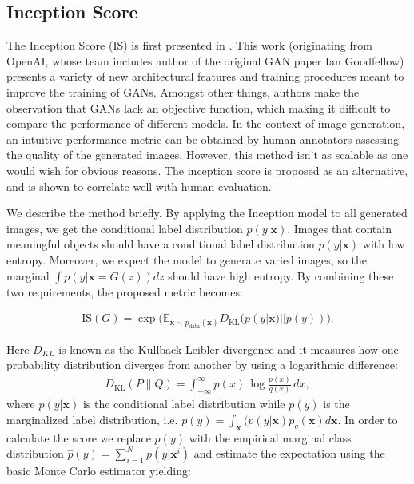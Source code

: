 \subsection{Inception Score}
The Inception Score (IS) is first presented in \cite{salimans2016improved}. This work (originating from OpenAI, whose team includes author of the original GAN paper Ian Goodfellow) presents a variety of new architectural features and training procedures meant to improve the training of GANs. Amongst other things, authors make the observation that GANs lack an objective function, which making it difficult to compare the performance of different models. In the context of image generation, an intuitive performance metric can be obtained by human annotators assessing the quality of the generated images. However, this method isn't as scalable as one would wish for obvious reasons. The inception score is proposed as an alternative, and is shown to correlate well with human evaluation. 

We describe the method briefly. By applying the Inception model \cite{inceptionv2} to all generated images, we get the conditional label distribution $p(y|\bm{x})$. Images that contain meaningful objects should have a conditional label distribution $p(y|\bm{x})$ with low entropy. Moreover, we expect the model to generate varied images, so the marginal $\int p(y|\bm{x} = G(z))dz$ should have high entropy. By combining these two requirements, the proposed metric becomes: 

\begin{equation}
\label{eq_IS}
\begin{split}
\text{IS}(G) = \exp \big(\mathbb{E}_{\bm{x} \sim p_{\text{data}}(\bm{x})}D_\text{KL}(p(y|\bm{x})||p(y))\big).
\end{split}
\end{equation}

Here $D_{KL}$ is known as the Kullback-Leibler divergence and it measures how one probability distribution diverges from another by using a logarithmic difference:
\begin{eqnarray}
	D_{\mathrm {KL} }(P\|Q)=\int _{-\infty }^{\infty }p(x)\,\log {\frac {p(x)}{q(x)}}\,dx,
\end{eqnarray}
where $p(y|\bm{x})$ is the conditional label distribution while $p(y)$ is the  marginalized label distribution, i.e. $p(y)=\int_{\bm{x}} (p(y|\bm{x})p_g(\bm{x}) d\bm{x}$. In order to calculate the score we replace $p(y)$ with the empirical marginal class distribution $\hat{p}(y) = \sum^N_{i=1} p(y|\bm{x}^i)$ and estimate the expectation using the basic Monte Carlo estimator yielding:

